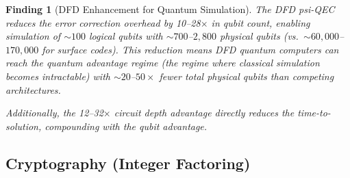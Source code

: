\documentclass[11pt]{article}
\newtheorem{finding}[theorem]{Finding}
\theoremstyle{definition}
\theoremstyle{remark}
\begin{document}
\begin{finding}[DFD Enhancement for Quantum Simulation]
\label{finding:dfd-sim}
The DFD psi-QEC reduces the error correction overhead by
10--28$\times$ in qubit count, enabling simulation of $\sim 100$
logical qubits with $\sim 700$--$2{,}800$ physical qubits (vs.\
$\sim 60{,}000$--$170{,}000$ for surface codes). This reduction
means DFD quantum computers can reach the quantum advantage regime
(the regime where classical simulation becomes intractable) with
$\sim 20$--$50\times$ fewer total physical qubits than competing
architectures.

Additionally, the 12--32$\times$ circuit depth advantage directly
reduces the time-to-solution, compounding with the qubit advantage.
\end{finding}

\subsection{Cryptography (Integer Factoring)}
\label{sec:crypto-speedup}
\end{document}

